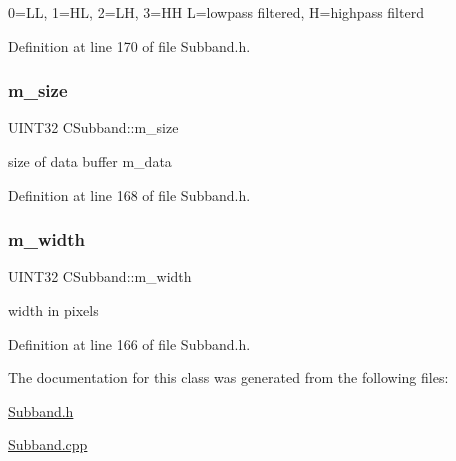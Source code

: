 0=LL, 1=HL, 2=LH, 3=HH L=lowpass filtered, H=highpass filterd 



Definition at line 170 of file Subband.\+h.

\mbox{\label{classCSubband_a1eca7bf4dad801599ffde81b9b25ab4d}} 
\subsubsection{\texorpdfstring{m\_size}{m\_size}}
{\footnotesize\ttfamily U\+I\+N\+T32 C\+Subband\+::m\+\_\+size\hspace{0.3cm}{\ttfamily [private]}}



size of data buffer m\+\_\+data 



Definition at line 168 of file Subband.\+h.

\mbox{\label{classCSubband_af83106176dc938d0dcd45c155e93a7ed}} 
\subsubsection{\texorpdfstring{m\_width}{m\_width}}
{\footnotesize\ttfamily U\+I\+N\+T32 C\+Subband\+::m\+\_\+width\hspace{0.3cm}{\ttfamily [private]}}



width in pixels 



Definition at line 166 of file Subband.\+h.



The documentation for this class was generated from the following files\+:\begin{DoxyCompactItemize}
\item 
\mbox{\hyperlink{Subband_8h}{Subband.\+h}}\item 
\mbox{\hyperlink{Subband_8cpp}{Subband.\+cpp}}\end{DoxyCompactItemize}
